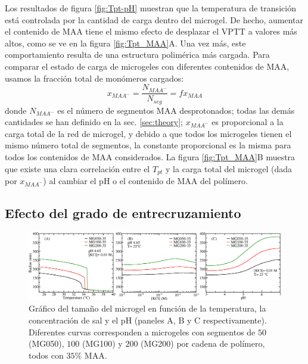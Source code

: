 Los resultados de figura \ref{fig:Tpt-pH} muestran que la temperatura de transici\'on est\'a controlada por la cantidad de carga dentro del microgel.
De hecho, aumentar el contenido de MAA tiene el mismo efecto de desplazar el VPTT a valores m\'as altos, como se ve en la figura \ref{fig:Tpt_MAA}A.
Una vez m\'as, este comportamiento resulta de una estructura polim\'erica m\'as cargada.
Para comparar el estado de carga de microgeles con diferentes contenidos de MAA, usamos la fracci\'on total de mon\'omeros cargados:
%
\begin{equation}
x_{MAA^-}=\frac{N_{MAA^-}}{N_{seg}}=f x_{MAA}
\end{equation}
%
\noindent donde $N_{MAA^-}$ es el n\'umero de segmentos MAA desprotonados; todas las dem\'as cantidades se han definido en la sec. \ref{sec:theory};
$x_{MAA^-}$ es proporcional a la carga total de la red de microgel, y
debido a que todos los microgeles tienen el mismo n\'umero total de segmentos, la constante proporcional es la misma para todos los contenidos de MAA considerados.
La figura \ref{fig:Tpt_MAA}B muestra que existe una clara correlaci\'on entre el $T_{pt}$ y la carga total del microgel (dada por $x_{MAA^-}$) al cambiar el pH o el contenido de MAA del pol\'imero.

\subsection{Efecto del grado de entrecruzamiento}


\begin{figure}[!tb]
	\centering
	\includegraphics[width=1\linewidth]{Figures/graph-gel/R-all_xlink.png}
	\caption{Gr\'afico del tama\~no del microgel en funci\'on de la temperatura, la concentraci\'on de sal y el pH (paneles A, B y C respectivamente).
		Diferentes curvas corresponden a microgeles con segmentos de $50$ (MG050), $100$ (MG100) y $200$ (MG200) por cadena de pol\'imero, todos con $35\%$ MAA.}
	\label{fig:R_xlink}
\end{figure}


